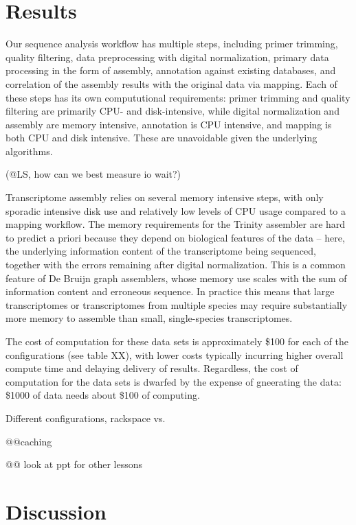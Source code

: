 \documentclass[11pt]{article}
\begin{document}
\section*{Results}

Our sequence analysis workflow has multiple steps, including primer
trimming, quality filtering, data preprocessing with digital
normalization, primary data processing in the form of assembly,
annotation against existing databases, and correlation of the assembly
results with the original data via mapping.  Each of these steps has
its own compututional requirements: primer trimming and quality
filtering are primarily CPU- and disk-intensive, while digital
normalization and assembly are memory intensive, annotation is CPU
intensive, and mapping is both CPU and disk intensive.  These are
unavoidable given the underlying algorithms.

(@LS, how can we best measure io wait?)

Transcriptome assembly relies on several memory intensive steps, with
only sporadic intensive disk use and relatively low levels of CPU
usage compared to a mapping workflow.  The memory requirements for the
Trinity assembler are hard to predict a priori because they depend on
biological features of the data -- here, the underlying information
content of the transcriptome being sequenced, together with the errors
remaining after digital normalization.  This is a common feature of De
Bruijn graph assemblers, whose memory use scales with the sum of
information content and erroneous sequence.  In practice this means
that large transcriptomes or transcriptomes from multiple species may
require substantially more memory to assemble than small,
single-species transcriptomes.

The cost of computation for these data sets is approximately \$100 for
each of the configurations (see table XX), with lower costs typically
incurring higher overall compute time and delaying delivery of results.
Regardless, the cost of computation for the data sets is dwarfed by
the expense of gneerating the data: \$1000 of data needs about \$100
of computing.

Different configurations, rackspace vs.

@@caching

@@ look at ppt for other lessons

\section*{Discussion}
\end{document}
